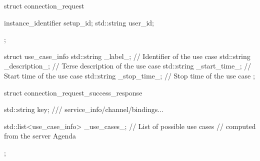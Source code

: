 


struct connection_request
{
  instance_identifier setup_id;
  std::string         user_id;


};

struct use_case_info
{
  std::string _label_;       // Identifier of the use case
  std::string _description_; // Terse description of the use case
  std::string _start_time_;  // Start time of the use case
  std::string _stop_time_;   // Stop time of the use case
};

struct connection_request_success_response
{
  std::string key;
  /// service_info/channel/bindings...

  std::list<use_case_info> _use_cases_; // List of possible use cases
                                       // computed from the server Agenda
};
